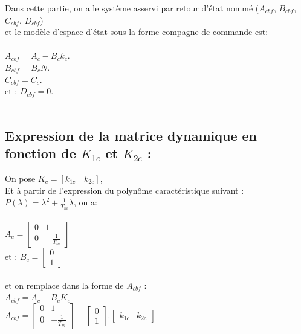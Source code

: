 Dans cette partie, on a le système asservi par retour d'état nommé ($A_{cbf}$, $B_{cbf}$, $C_{cbf}$, $D_{cbf}$)\\ 

et le modèle d'espace d'état sous la forme compagne de commande est:\\\\

 $A_{cbf}=A_{c}-B_{c}k_{c}$.\\

 $B_{cbf}=B_{c}N$.\\

 $C_{cbf}=C_{c}$. \\
 
 et : \quad $D_{cbf}=0$.\\\\
 
 
\subsection{Expression de la matrice dynamique en fonction de $K_{1c}$ et $K_{2c}$ :}
 On pose $K_{c}=[k_{1c} \quad k_{2c}]$,\\ 

Et à partir de l'expression du polynôme caractéristique suivant : $ P(\lambda)=\lambda^2+\frac{1}{T_m}\lambda$, on a: \\\\

$A_{c}=\begin{bmatrix}
  0&1\\
  0&-\frac{1}{T_{m}}
    \end{bmatrix}$\\

\quad et : $B_{c}=\begin{bmatrix}

            0\\1
            \end{bmatrix}$ \\\\
et on remplace dans la forme de $A_{cbf}$ :\\ 
$A_{cbf}=A_{c}-B_{c}K_{c}$\\

$A_{cbf}=\begin{bmatrix}
0&1\\
0&-\frac{1}{T_{m}}
\end{bmatrix}
   - \begin{bmatrix}
     0\\1
   \end{bmatrix}. 
   \begin{bmatrix}
   k_{1c}&k_{2c}
   \end{bmatrix}$ \\\\
  
